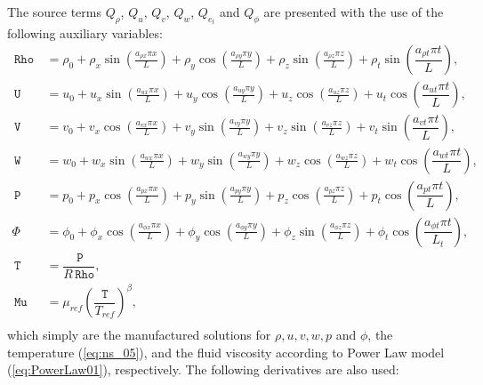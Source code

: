 \documentclass[10pt]{article}
\newcommand{\Rho}{\,\mathtt{Rho}}
\newcommand{\PP}{\,\mathtt{P}}
\newcommand{\U}{\,\mathtt{U}}
\newcommand{\V}{\,\mathtt{V}}
\newcommand{\W}{\,\mathtt{W}}
\newcommand{\Mu}{\,\mathtt{Mu}}
\newcommand{\T}{\,\mathtt{T}\,}
\begin{document}
The source terms $Q_\rho$, $Q_u$, $Q_v$, $Q_w$, $Q_{e_t}$ and $Q_\phi$ are  presented with the use of the following auxiliary variables:
\begin{equation}
 \begin{split}
\label{eq:aux_01}
\Rho \, &= \rho_{0}+ \rho_{x} \sin\left(\frac{a_{ \rho  x} \pi x}{L}\right)+ \rho_{y} \cos\left(\frac{a_{ \rho  y} \pi y}{L}\right) + \rho_{z} \sin\left(\frac{a_{ \rho  z} \pi z}{L}\right)+ \rho_t \sin\left(\dfrac{a_{\rho t} \pi t}{L}\right),\\
\U&=u_{0}+u_{x} \sin\left(\frac{a_{u  x} \pi x}{L}\right)+u_{y} \cos\left(\frac{a_{u  y} \pi y}{L}\right)+u_{z} \cos\left(\frac{a_{u  z} \pi z}{L}\right) + u_t \cos\left(\dfrac{a_{u t} \pi t}{L}\right) ,\\
\V \, &= v_{0}+v_{x} \cos\left(\frac{a_{v  x} \pi x}{L}\right)+v_{y} \sin\left(\frac{a_{v  y} \pi y}{L}\right)+v_{z} \sin\left(\frac{a_{v  z} \pi z}{L}\right)+ v_t \sin\left(\dfrac{a_{v t} \pi t}{L}\right), \\
\W \, &= w_{0}+w_{x} \sin\left(\frac{a_{w  x} \pi x}{L}\right)+w_{y} \sin\left(\frac{a_{w  y} \pi y}{L}\right)+ w_{z} \cos\left(\frac{a_{w  z} \pi z}{L}\right) + w_t \cos\left(\dfrac{a_{w t} \pi t}{L}\right),\\
\PP \, &= p_{0}+p_{x} \cos\left(\frac{a_{p  x} \pi x}{L}\right)+p_{y} \sin\left(\frac{a_{p  y} \pi y}{L}\right)+ p_{z} \cos\left(\frac{a_{p  z} \pi z}{L}\right)+ p_t \cos\left(\dfrac{a_{p t} \pi t}{L}\right),\\
\Phi \,  &= \phi_{0}+\phi_{x} \cos\left(\frac{a_{\phi  x} \pi x}{L}\right)+\phi_{y} \cos\left(\frac{a_{\phi  y} \pi y}{L}\right)+ \phi_{z} \sin\left(\frac{a_{\phi  z} \pi z}{L}\right)+ \phi_t \cos\left(\dfrac{a_{\phi t} \pi t}{L_t}\right),\\
\T&= \dfrac{\PP}{R\Rho},\\
\Mu  &=\mu_{ref}\left(\dfrac{\T}{T_{ref}}\right)^\beta,\\
\end{split}
\end{equation}
which simply are the manufactured solutions for $\rho, u, v, w, p$ and $\phi$, the temperature (\ref{eq:ns_05}), and  the fluid viscosity according to Power Law model (\ref{eq:PowerLaw01}), respectively. The following derivatives are also used:
% 
\end{document}
